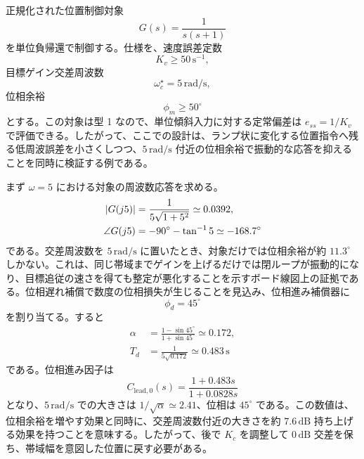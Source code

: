 \begin{example}[遅れ進み補償器による周波数仕様設計]
正規化された位置制御対象
\begin{equation}
  G(s)=\frac{1}{s(s+1)}
\end{equation}
を単位負帰還で制御する。仕様を、速度誤差定数
\begin{equation}
  K_v\ge 50\,\mathrm{s^{-1}},
\end{equation}
目標ゲイン交差周波数
\begin{equation}
  \omega_c^\star=5\,\mathrm{rad/s},
\end{equation}
位相余裕
\begin{equation}
  \phi_m\ge50^\circ
\end{equation}
とする。この対象は型 1 なので、単位傾斜入力に対する定常偏差は $e_{ss}=1/K_v$ で評価できる。したがって、ここでの設計は、ランプ状に変化する位置指令へ残る低周波誤差を小さくしつつ、$5\,\mathrm{rad/s}$ 付近の位相余裕で振動的な応答を抑えることを同時に検証する例である。

まず $\omega=5$ における対象の周波数応答を求める。
\begin{align}
  \left|G(j5)\right|
  &=\frac{1}{5\sqrt{1+5^2}}
    \simeq 0.0392,\\
  \angle G(j5)
  &=-90^\circ-\tan^{-1}5
    \simeq -168.7^\circ
\end{align}
である。交差周波数を $5\,\mathrm{rad/s}$ に置いたとき、対象だけでは位相余裕が約 $11.3^\circ$ しかない。これは、同じ帯域までゲインを上げるだけでは閉ループが振動的になり、目標追従の速さを得ても整定が悪化することを示すボード線図上の証拠である。位相遅れ補償で数度の位相損失が生じることを見込み、位相進み補償器に
\begin{equation}
  \phi_d=45^\circ
\end{equation}
を割り当てる。すると
\begin{align}
  \alpha
  &=\frac{1-\sin45^\circ}{1+\sin45^\circ}
    \simeq 0.172,\\
  T_d
  &=\frac{1}{5\sqrt{0.172}}
    \simeq 0.483\,\mathrm{s}
\end{align}
である。位相進み因子は
\begin{equation}
  C_{\mathrm{lead},0}(s)
  =\frac{1+0.483s}{1+0.0828s}
\end{equation}
となり、$5\,\mathrm{rad/s}$ での大きさは $1/\sqrt{\alpha}\simeq2.41$、位相は $45^\circ$ である。この数値は、位相余裕を増やす効果と同時に、交差周波数付近の大きさを約 $7.6\,\mathrm{dB}$ 持ち上げる効果を持つことを意味する。したがって、後で $K_c$ を調整して $0\,\mathrm{dB}$ 交差を保ち、帯域幅を意図した位置に戻す必要がある。


\end{example}
